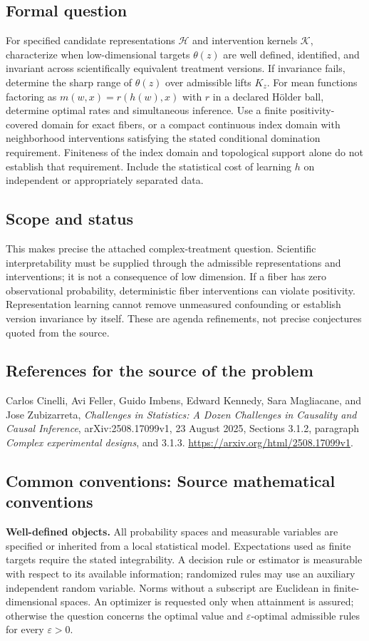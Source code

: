\documentclass[11pt,a4paper]{article}
\begin{document}
\subsection*{Formal question}
For specified candidate representations $\mathcal H$ and intervention kernels $\mathcal K$, characterize when low-dimensional targets $\theta(z)$ are well defined, identified, and invariant across scientifically equivalent treatment versions. If invariance fails, determine the sharp range of $\theta(z)$ over admissible lifts $K_z$. For mean functions factoring as $m(w,x)=r(h(w),x)$ with $r$ in a declared Hölder ball, determine optimal rates and simultaneous inference. Use a finite positivity-covered domain for exact fibers, or a compact continuous index domain with neighborhood interventions satisfying the stated conditional domination requirement. Finiteness of the index domain and topological support alone do not establish that requirement. Include the statistical cost of learning $h$ on independent or appropriately separated data.
\subsection*{Scope and status}
This makes precise the attached complex-treatment question. Scientific interpretability must be supplied through the admissible representations and interventions; it is not a consequence of low dimension. If a fiber has zero observational probability, deterministic fiber interventions can violate positivity. Representation learning cannot remove unmeasured confounding or establish version invariance by itself. These are agenda refinements, not precise conjectures quoted from the source.
\subsection*{References for the source of the problem}
Carlos Cinelli, Avi Feller, Guido Imbens, Edward Kennedy, Sara Magliacane, and Jose Zubizarreta, \emph{Challenges in Statistics: A Dozen Challenges in Causality and Causal Inference}, arXiv:2508.17099v1, 23 August 2025, Sections 3.1.2, paragraph \emph{Complex experimental designs}, and 3.1.3. \url{https://arxiv.org/html/2508.17099v1}.

\subsection*{Common conventions: Source mathematical conventions}

\textbf{Well-defined objects.}
All probability spaces and measurable variables are specified or inherited
from a local statistical model. Expectations used as finite targets require
the stated integrability. A decision rule or estimator is measurable with
respect to its available information; randomized rules may use an auxiliary
independent random variable. Norms without a subscript are Euclidean in
finite-dimensional spaces. An optimizer is requested only when attainment
is assured; otherwise the question concerns the optimal value and
$\varepsilon$-optimal admissible rules for every $\varepsilon>0$.
\end{document}
